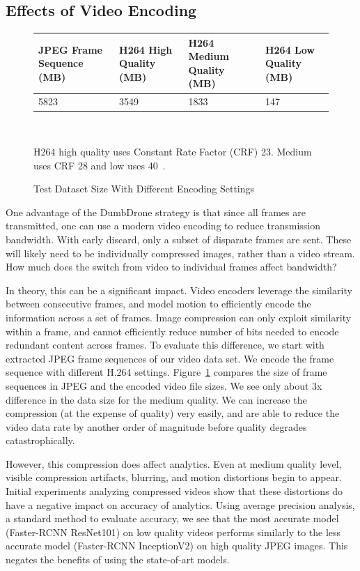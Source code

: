 \subsection{Effects of Video Encoding}

\begin{figure}
\centering
\begin{tabular}{|p{1.5cm}|p{1.3cm}|p{1.3cm}|p{1.3cm}|}
\hline
JPEG Frame Sequence (MB)  & H264 High Quality (MB)       & H264 Medium Quality (MB) & H264 Low Quality (MB)\\
\hline
5823 & 3549  & 1833 & 147\\
\hline
\end{tabular}\\
\vspace{0.1in}
\begin{captiontext}
H264 high quality uses Constant Rate Factor (CRF) 23. Medium
uses CRF 28 and low uses 40~\cite{Merritt2007}.
\end{captiontext}
\caption{Test Dataset Size With Different Encoding Settings}
\label{fig:video-vs-images}
\end{figure}


One advantage of the {\xc DumbDrone} strategy is that since all
frames are transmitted, one can use a modern video encoding to
reduce transmission bandwidth.  With early discard, only a subset
of disparate frames are sent.  These will likely need to be
individually compressed images, rather than a video stream.  How
much does the switch from video to individual frames affect
bandwidth?  

In theory, this can be a significant impact. Video encoders leverage the
similarity between consecutive frames, and model motion to efficiently encode
the information across a set of frames. Image compression can only exploit
similarity within a frame, and cannot efficiently reduce number of bits needed
to encode redundant content across frames. To evaluate this difference, we start
with extracted JPEG frame sequences of our video data set. We encode the frame
sequence with different H.264 settings. Figure~\ref{fig:video-vs-images}
compares the size of frame sequences in JPEG and the encoded video file sizes.
We see only about 3x difference in the data size for the medium quality. We can
increase the compression (at the expense of quality) very easily, and are able
to reduce the video data rate by another order of magnitude before quality
degrades catastrophically.

However, this compression does affect analytics. Even at medium quality level,
visible compression artifacts, blurring, and motion distortions begin to appear.
Initial experiments analyzing compressed videos show that these distortions do
have a negative impact on accuracy of analytics. Using average precision
analysis, a standard method to evaluate accuracy, we see that the 
most accurate model (Faster-RCNN ResNet101) on low quality videos performs similarly
to the less accurate model (Faster-RCNN InceptionV2) on high quality
JPEG images. This negates the benefits of using the state-of-art models.

